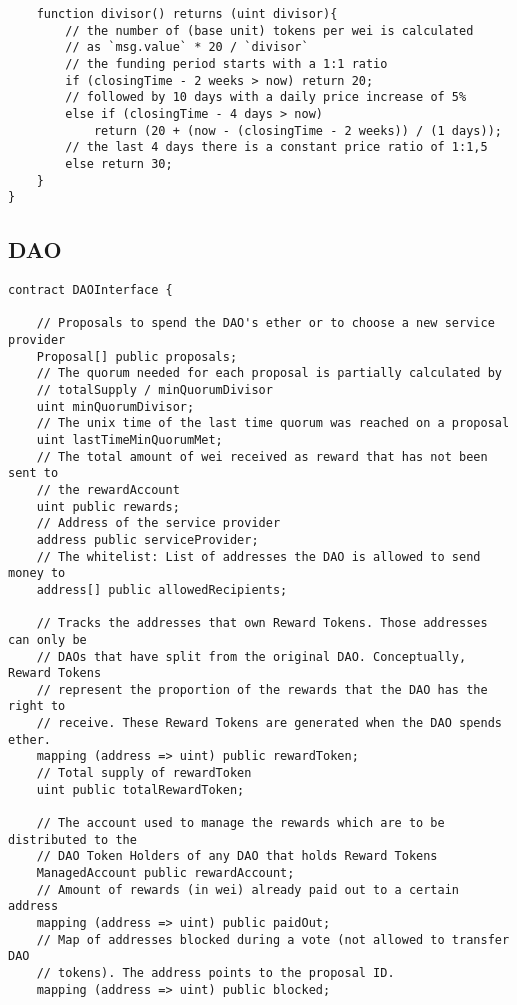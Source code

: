 \documentclass[9pt,oneside]{amsart}
\begin{document}
\begin{appendix}
\begin{verbatim}
    function divisor() returns (uint divisor){
        // the number of (base unit) tokens per wei is calculated
        // as `msg.value` * 20 / `divisor`
        // the funding period starts with a 1:1 ratio
        if (closingTime - 2 weeks > now) return 20;
        // followed by 10 days with a daily price increase of 5%
        else if (closingTime - 4 days > now)
            return (20 + (now - (closingTime - 2 weeks)) / (1 days));
        // the last 4 days there is a constant price ratio of 1:1,5
        else return 30;
    }
}
\end{verbatim}
\subsection{DAO}\label{app:DAO}
\begin{verbatim}
contract DAOInterface {

    // Proposals to spend the DAO's ether or to choose a new service provider
    Proposal[] public proposals;
    // The quorum needed for each proposal is partially calculated by
    // totalSupply / minQuorumDivisor
    uint minQuorumDivisor;
    // The unix time of the last time quorum was reached on a proposal
    uint lastTimeMinQuorumMet;
    // The total amount of wei received as reward that has not been sent to
    // the rewardAccount
    uint public rewards;
    // Address of the service provider
    address public serviceProvider;
    // The whitelist: List of addresses the DAO is allowed to send money to
    address[] public allowedRecipients;

    // Tracks the addresses that own Reward Tokens. Those addresses can only be
    // DAOs that have split from the original DAO. Conceptually, Reward Tokens
    // represent the proportion of the rewards that the DAO has the right to
    // receive. These Reward Tokens are generated when the DAO spends ether.
    mapping (address => uint) public rewardToken;
    // Total supply of rewardToken
    uint public totalRewardToken;

    // The account used to manage the rewards which are to be distributed to the
    // DAO Token Holders of any DAO that holds Reward Tokens
    ManagedAccount public rewardAccount;
    // Amount of rewards (in wei) already paid out to a certain address
    mapping (address => uint) public paidOut;
    // Map of addresses blocked during a vote (not allowed to transfer DAO
    // tokens). The address points to the proposal ID.
    mapping (address => uint) public blocked;


\end{verbatim}
\end{appendix}
\end{document}
